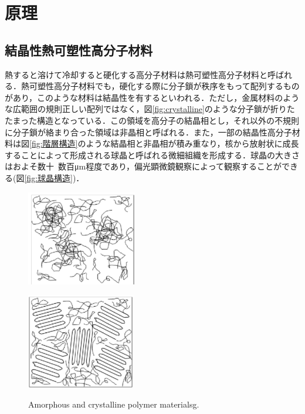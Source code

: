\section{原理}

\subsection{結晶性熱可塑性高分子材料}
熱すると溶けて冷却すると硬化する高分子材料は熱可塑性高分子材料と呼ばれる．熱可塑性高分子材料でも，硬化する際に分子鎖が秩序をもって配列するものがあり，このような材料は結晶性を有するといわれる．ただし，金属材料のような広範囲の規則正しい配列ではなく，図\ref{fig:crystalline}のような分子鎖が折りたたまった構造となっている．この領域を高分子の結晶相とし，それ以外の不規則に分子鎖が絡まり合った領域は非晶相と呼ばれる．また，一部の結晶性高分子材料は図\ref{fig:階層構造}のような結晶相と非晶相が積み重なり，核から放射状に成長することによって形成される球晶と呼ばれる微細組織を形成する．球晶の大きさはおよそ数十~数百μm程度であり，偏光顕微鏡観察によって観察することができる(図\ref{fig:球晶構造})．

\begin{figure}[htbp]
    \begin{minipage}[htbp]{0.45\linewidth}
      \centering
      \includegraphics[keepaspectratio, scale=1]{fig/fig_amorphous.png}
      \label{fig:amorphous}
    \end{minipage}
    \begin{minipage}[htbp]{0.45\linewidth}
      \centering
      \includegraphics[keepaspectratio, scale=1]{fig/fig_crystalline.png}
      \label{fig:crystalline}
    \end{minipage}
    \centering
    \caption{Amorphous and crystalline polymer materialsg.}
    \label{fig:amorphous_crystalline}
\end{figure}

